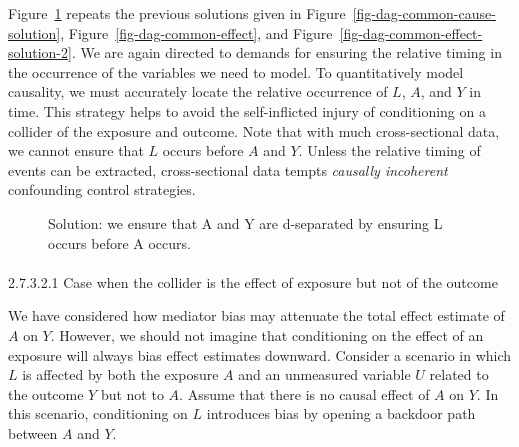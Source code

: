 \documentclass[
  singlecolumn]{article}
\makeatletter
\let\oldparagraph\paragraph
\renewcommand{\paragraph}{
    \@ifstar
      \xxxParagraphStar
      \xxxParagraphNoStar
  }
\newcommand{\xxxParagraphStar}[1]{\oldparagraph*{#1}\mbox{}}
\newcommand{\xxxParagraphNoStar}[1]{\oldparagraph{#1}\mbox{}}
\makeatother
\begin{document}
Figure~\ref{fig-dag-common-effect-solution-3} repeats the previous
solutions given in Figure~\ref{fig-dag-common-cause-solution},
Figure~\ref{fig-dag-common-effect}, and
Figure~\ref{fig-dag-common-effect-solution-2}. We are again directed to
demands for ensuring the relative timing in the occurrence of the
variables we need to model. To quantitatively model causality, we must
accurately locate the relative occurrence of \(L\), \(A\), and \(Y\) in
time. This strategy helps to avoid the self-inflicted injury of
conditioning on a collider of the exposure and outcome. Note that with
much cross-sectional data, we cannot ensure that \(L\) occurs before
\(A\) and \(Y\). Unless the relative timing of events can be extracted,
cross-sectional data tempts \emph{causally incoherent} confounding
control strategies.

\begin{figure}


\caption{\label{fig-dag-common-effect-solution-3}Solution: we ensure
that A and Y are d-separated by ensuring L occurs before A occurs.}

\end{figure}%

\paragraph{2.7.3.2.1 Case when the collider is the effect of exposure
but not of the
outcome}\label{case-when-the-collider-is-the-effect-of-exposure-but-not-of-the-outcome}

We have considered how mediator bias may attenuate the total effect
estimate of \(A\) on \(Y\). However, we should not imagine that
conditioning on the effect of an exposure will always bias effect
estimates downward. Consider a scenario in which \(L\) is affected by
both the exposure \(A\) and an unmeasured variable \(U\) related to the
outcome \(Y\) but not to \(A\). Assume that there is no causal effect of
\(A\) on \(Y\). In this scenario, conditioning on \(L\) introduces bias
by opening a backdoor path between \(A\) and \(Y\).
\end{document}
